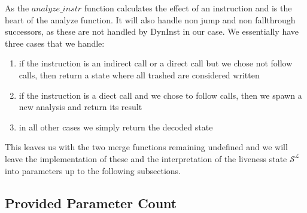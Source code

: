 As the $analyze\_instr$ function calculates the effect of an instruction and is the heart of the analyze function. It will also handle non jump and non fallthrough successors, as these are not handled by DynInst in our case. We essentially have three cases that we handle:
\begin{enumerate}
\item if the instruction is an indirect call or a direct call but we chose not follow calls, then return a state where all trashed are considered written
\item if the instruction is a diect call and we chose to follow calls, then we spawn a new analysis and return its result 
\item in all other cases we simply return the decoded state
\end{enumerate}

This leaves us with the two merge functions remaining undefined and we will leave the implementation of these and the interpretation of the liveness state $\mathcal{S}^\mathcal{L}$ into parameters up to the following subsections.

%
%

\subsection{Provided Parameter Count}
\label{subsection:providedparamcount}

